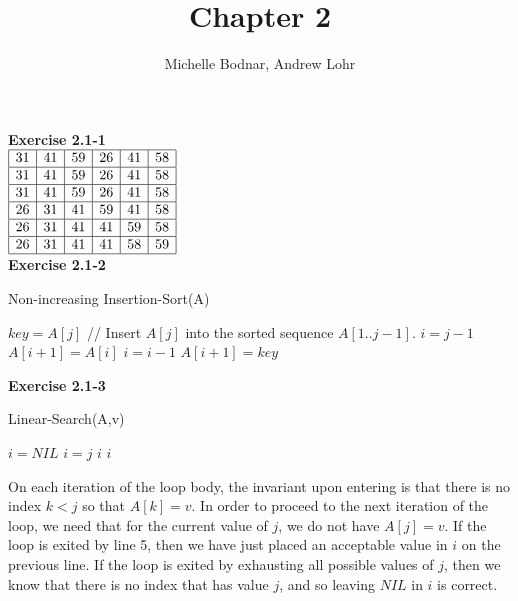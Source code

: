 \documentclass{article}
\title{Chapter 2}
\author{Michelle Bodnar, Andrew Lohr}
\begin{document}
\maketitle

\noindent\textbf{ Exercise 2.1-1} \\

$
\begin{array}{|c|c|c|c|c|c|}
\hline
31&41&59&26&41&58\\
\hline
31&41&59&26&41&58\\
\hline
31&41&59&26&41&58\\
\hline
26&31&41&59&41&58\\
\hline
26&31&41&41&59&58\\
\hline
26&31&41&41&58&59\\
\hline
\end{array}
$ \\

\noindent\textbf{ Exercise 2.1-2}\\

\begin{algorithm}
\caption{Non-increasing Insertion-Sort(A)}
\begin{algorithmic}[1]
	\State $key = A[j]$
	\State // Insert $A[j]$ into the sorted sequence $A[1..j-1]$.
	\State $i=j-1$
		\State $A[i+1] = A[i]$
		\State $i=i-1$
	\EndWhile
\State $A[i+1] = key$
\EndFor
\end{algorithmic}
\end{algorithm}


\noindent\textbf{ Exercise 2.1-3}\\

\begin{algorithm} \begin{algorithmic}[1]
\caption{Linear-Search(A,v)}
 \State $i=NIL$
 \State $i = j$
 \State \Return $i$
 \EndIf 
 \EndFor
\State \Return $i$
 \end{algorithmic}
\end{algorithm}
On each iteration of the loop body, the invariant upon entering is that there is no index $k<j$ so that $A[k]=v$. In order to proceed to the next iteration of the loop, we need that for the current value of $j$, we do not have $A[j] =v$. If the loop is exited by line 5, then we have just placed an acceptable value in $i$ on the previous line. If the loop is exited by exhausting all possible values of $j$, then we know that there is no index that has value $j$, and so leaving $NIL$ in $i$ is correct. \\
\end{document}
